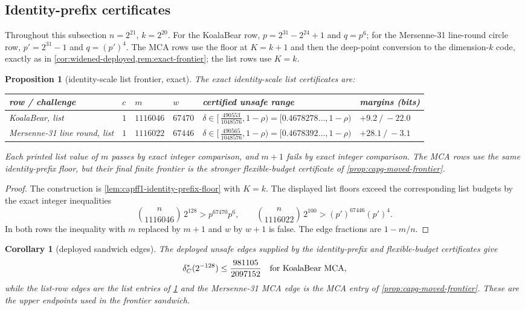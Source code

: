 \documentclass[11pt]{article}
\newtheorem{proposition}[proposition]{Proposition}
\newtheorem{corollary}[corollary]{Corollary}
\theoremstyle{definition}
\theoremstyle{remark}
\begin{document}
\subsection{Identity-prefix certificates}

Throughout this subsection $n=2^{21}$, $k=2^{20}$.  For the KoalaBear row, $p=2^{31}-2^{24}+1$ and $q=p^6$; for the Mersenne-31 line-round circle row, $p'=2^{31}-1$ and $q=(p')^4$.  The MCA rows use the floor at $K=k+1$ and then the deep-point conversion to the dimension-$k$ code, exactly as in \cref{cor:widened-deployed,rem:exact-frontier}; the list rows use $K=k$.


\begin{proposition}[identity-scale list frontier, exact]\label{prop:capff1-identity-frontier}
The exact identity-scale list certificates are:
\begin{center}\footnotesize
\begin{tabular}{@{}llllll@{}}
\toprule
row / challenge & $c$ & $m$ & $w$ & certified unsafe range & margins (bits)\\
\midrule
KoalaBear, list & $1$ & $1116046$ & $67470$ &
$\delta\in[\,\tfrac{490553}{1048576},1-\rho)=[0.4678278\ldots,1-\rho)$ & $+9.2\ /\ -22.0$\\
Mersenne-31 line round, list & $1$ & $1116022$ & $67446$ &
$\delta\in[\,\tfrac{490565}{1048576},1-\rho)=[0.4678392\ldots,1-\rho)$ & $+28.1\ /\ -3.1$\\
\bottomrule
\end{tabular}
\end{center}
Each printed list value of $m$ passes by exact integer comparison, and $m+1$
fails by exact integer comparison.  The MCA rows use the same identity-prefix
floor, but their final finite frontier is the stronger flexible-budget
certificate of \cref{prop:capg-moved-frontier}.
\end{proposition}

\begin{proof}
The construction is \cref{lem:capff1-identity-prefix-floor} with $K=k$.  The
displayed list floors exceed the corresponding list budgets by the exact
integer inequalities
\[
\binom n{1116046}\,2^{128}>p^{67470}p^6,
\qquad
\binom n{1116022}\,2^{100}>(p')^{67446}(p')^4.
\]
In both rows the inequality with $m$ replaced by $m+1$ and $w$ by $w+1$ is
false.  The edge fractions are $1-m/n$.
\end{proof}


\begin{corollary}[deployed sandwich edges]\label{cor:capff1-sandwich-edges}
The deployed unsafe edges supplied by the identity-prefix and flexible-budget certificates give \[ \delta^*_C(2^{-128})\le {981105\over2097152} \quad\text{for KoalaBear MCA}, \] while the list-row edges are the list entries of \cref{prop:capff1-identity-frontier} and the Mersenne-31 MCA edge is the MCA entry of \cref{prop:capg-moved-frontier}.  These are the upper endpoints used in the frontier sandwich.
\end{corollary}
\end{document}
